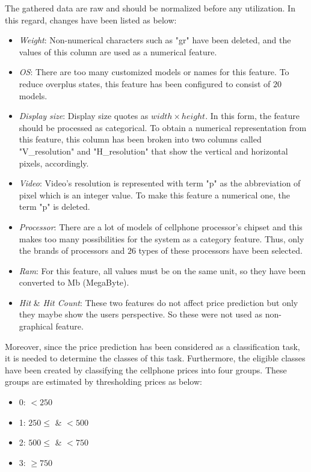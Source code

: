 \documentclass{svjour3}                     \smartqed  \usepackage{graphicx}
\begin{document}
The gathered data are raw and should be normalized before any utilization. In this regard, changes have been listed as below:
\begin{itemize}
    \item \textit{Weight}: Non-numerical characters such as "gr" have been deleted, and the values of this column are used as a numerical feature.
    \item \textit{OS}: There are too many customized models or names for this feature. To reduce overplus states, this feature has been configured to consist of $20$ models.
    \item \textit{Display size}: Display size quotes as $width \times height$. In this form, the feature should be processed as categorical. To obtain a numerical representation from this feature, this column has been broken into two columns called "V\_resolution" and "H\_resolution" that show the vertical and horizontal pixels, accordingly.
    \item \textit{Video}:  Video's resolution is represented with term "p" as the abbreviation of pixel which is an integer value. To make this feature a numerical one, the term "p" is deleted.
    \item \textit{Processor}: There are a lot of models of cellphone processor's chipset and this makes too many possibilities for the system as a category feature. Thus, only the brands of processors and  $26$ types of these processors have been selected.
    \item \textit{Ram}: For this feature, all values must be on the same unit, so they have been converted to Mb (MegaByte).
    \item \textit{Hit} \& \textit{Hit Count}: These two features do not affect price prediction but only they maybe show the users perspective. So these were not used as non-graphical feature.
\end{itemize}

Moreover, since the price prediction has been considered as a classification task, it is needed to determine the classes of this task. Furthermore, the eligible classes have been created by classifying the cellphone prices into four groups. These groups are estimated by thresholding prices as below:
\begin{itemize}
    \item 0: $< 250$
    \item 1: $250 \leq$ \& $< 500$
    \item 2: $500 \leq$ \& $< 750$
    \item 3: $\geq 750$
\end{itemize}
\end{document}
